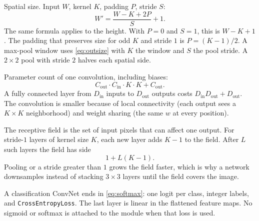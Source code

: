 \documentclass[11pt]{article}
\begin{document}
Spatial size. Input $W$, kernel $K$, padding $P$, stride $S$:
\begin{equation}
W'
=
\frac{W-K+2P}{S}+1.
\label{eq:outsize}
\end{equation}
The same formula applies to the height. With $P=0$ and $S=1$, this is $W-K+1$. The padding that preserves size for odd $K$ and stride $1$ is $P=(K-1)/2$. A max-pool window uses \eqref{eq:outsize} with $K$ the window and $S$ the pool stride. A $2\times 2$ pool with stride $2$ halves each spatial side.

Parameter count of one convolution, including biases:
\begin{equation}
C_{\mathrm{out}}\cdot C_{\mathrm{in}}\cdot K\cdot K+C_{\mathrm{out}}.
\end{equation}
A fully connected layer from $D_{\mathrm{in}}$ inputs to $D_{\mathrm{out}}$ outputs costs $D_{\mathrm{in}}D_{\mathrm{out}}+D_{\mathrm{out}}$. The convolution is smaller because of local connectivity (each output sees a $K\times K$ neighborhood) and weight sharing (the same $w$ at every position).

The receptive field is the set of input pixels that can affect one output. For stride-$1$ layers of kernel size $K$, each new layer adds $K-1$ to the field. After $L$ such layers the field has side
\begin{equation}
1+L(K-1).
\end{equation}
Pooling or a stride greater than $1$ grows the field faster, which is why a network downsamples instead of stacking $3\times 3$ layers until the field covers the image.

A classification ConvNet ends in \eqref{eq:softmax}: one logit per class, integer labels, and \texttt{CrossEntropyLoss}. The last layer is linear in the flattened feature maps. No sigmoid or softmax is attached to the module when that loss is used.
\end{document}
